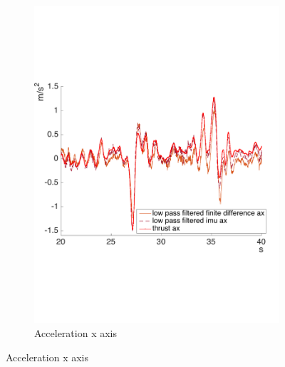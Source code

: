 \begin{figure}[!htbp]
\begin{subfigure}[b]{0.45\textwidth}
     \includegraphics[width=\textwidth]{img/acc_x.pdf}
        \caption{Acceleration x axis}
        \label{fig:comparison_accx_fil}
   \end{subfigure}
   

\end{figure}

